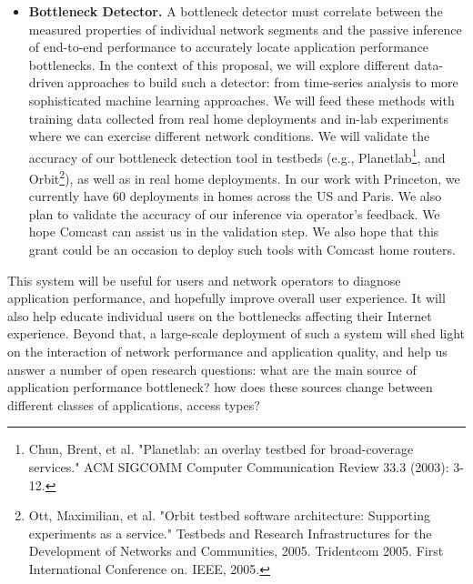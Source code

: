 \documentclass[11 pt]{article}
\begin{document}
\begin{itemize}
%

\item \textbf{Bottleneck Detector.} A bottleneck detector must correlate between the measured properties of individual network segments and the passive inference of end-to-end performance to accurately locate application performance bottlenecks. In the context of this proposal, we will explore different data-driven approaches to build such a detector: from time-series analysis to more sophisticated machine learning approaches. We will feed these methods with training data collected from real home deployments and in-lab experiments where we can exercise different network conditions. We will validate the accuracy of our bottleneck detection tool in testbeds (e.g., Planetlab\footnote{Chun, Brent, et al. "Planetlab: an overlay testbed for broad-coverage services." ACM SIGCOMM Computer Communication Review 33.3 (2003): 3-12.}, and Orbit\footnote{Ott, Maximilian, et al. "Orbit testbed software architecture: Supporting experiments as a service." Testbeds and Research Infrastructures for the Development of Networks and Communities, 2005. Tridentcom 2005. First International Conference on. IEEE, 2005.}), as well as in real home deployments. In our work with Princeton, we currently have 60 deployments in homes across the US and Paris. We also plan to validate the accuracy of our inference via operator's feedback. We hope Comcast can assist us in the validation step. We also hope that this grant could be an occasion to deploy such tools with Comcast home routers.
\end{itemize}

This system will be useful for users and network operators to diagnose application performance, and hopefully improve overall user experience. It will also help educate individual users on the bottlenecks affecting their Internet experience. Beyond that, a large-scale deployment of such a system will shed light on the interaction of network performance and application quality, and help us answer a number of open research questions: what are the main source of application performance bottleneck? how does these sources change between different classes of applications, access types?\\
\end{document}
